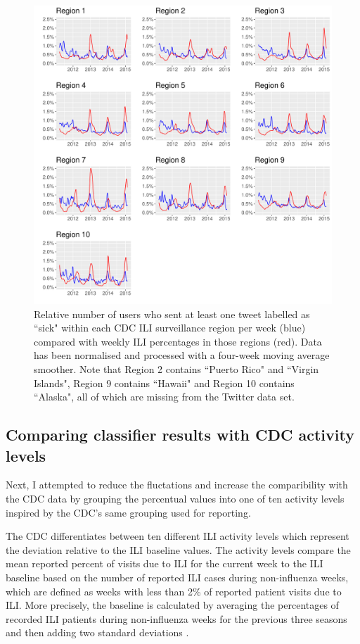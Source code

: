 \documentclass[11pt, a4paper,twoside]{report}\usepackage[]{graphicx}\usepackage[]{color}
\begin{document}
\begin{figure}[H]
\centering
\includegraphics[width=1\linewidth]{33_cdc_twitter_comp_regs_ma4_user.pdf}
\caption{Relative number of users who sent at least one tweet labelled as ``sick" within each CDC ILI surveillance region per week (blue) compared with weekly ILI percentages in those regions (red). Data has been normalised and processed with a four-week moving average smoother. Note that Region 2 contains ``Puerto Rico" and ``Virgin Islands", Region 9 contains ``Hawaii" and Region 10 contains ``Alaska", all of which are missing from the Twitter data set.}
\label{fig:cdc_tw_comp_regs_ma4_user}
\end{figure}

\subsection{Comparing classifier results with CDC activity levels}
\label{sec:comp_cdc_ac}
Next, I attempted to reduce the fluctations and increase the comparibility with the CDC data by grouping the percentual values into one of ten activity levels inspired by the CDC's same grouping used for reporting.

The CDC differentiates between ten different ILI activity levels which represent the deviation relative to the ILI baseline values. The activity levels compare the mean reported percent of visits due to ILI for the current week to the ILI baseline based on the number of reported ILI cases during non-influenza weeks, which are defined as weeks with less than 2\% of reported patient visits due to ILI. More precisely, the baseline is calculated by averaging the percentages of recorded ILI patients during non-influenza weeks for the previous three seasons and then adding two standard deviations \citep{cdc_surveillance_2016}.
\end{document}
